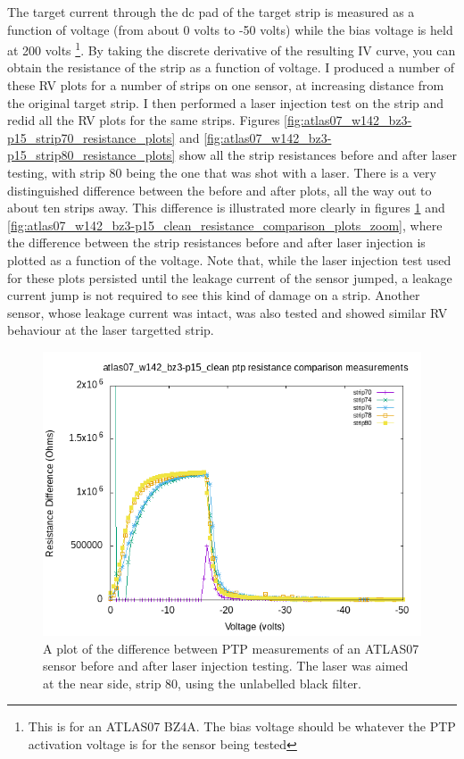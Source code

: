 \documentclass{report}
\begin{document}
            The target current through the dc pad of the target strip is measured as a function of voltage (from about 0 volts to -50 volts) while the bias voltage is held at 200 volts \footnote{This is for an ATLAS07 BZ4A. The bias voltage should be whatever the PTP activation voltage is for the sensor being tested}. By taking the discrete derivative of the resulting IV curve, you can obtain the resistance of the strip as a function of voltage. I produced a number of these RV plots for a number of strips on one sensor, at increasing distance from the original target strip. I then performed a laser injection test on the strip and redid all the RV plots for the same strips. Figures \ref{fig:atlas07_w142_bz3-p15_strip70_resistance_plots} and \ref{fig:atlas07_w142_bz3-p15_strip80_resistance_plots} show all the strip resistances before and after laser testing, with strip 80 being the one that was shot with a laser. There is a very distinguished difference between the before and after plots, all the way out to about ten strips away. This difference is illustrated more clearly in figures \ref{fig:atlas07_w142_bz3-p15_clean_resistance_comparison_plots_base} and \ref{fig:atlas07_w142_bz3-p15_clean_resistance_comparison_plots_zoom}, where the difference between the strip resistances before and after laser injection is plotted as a function of the voltage. Note that, while the laser injection test used for these plots persisted until the leakage current of the sensor jumped, a leakage current jump is not required to see this kind of damage on a strip. Another sensor, whose leakage current was intact, was also tested and showed similar RV behaviour at the laser targetted strip.

            \begin{figure}[h] 
                \includegraphics[height=.4\textheight]{atlas07_w142_bz3-p15_clean_resistance_comparison_plots_base}
                \centering
                \caption{ A plot of the difference between PTP measurements of an ATLAS07 sensor before and after laser injection testing. The laser was aimed at the near side, strip 80, using the unlabelled black filter. }
                \label{fig:atlas07_w142_bz3-p15_clean_resistance_comparison_plots_base}
            \end{figure}
\end{document}
